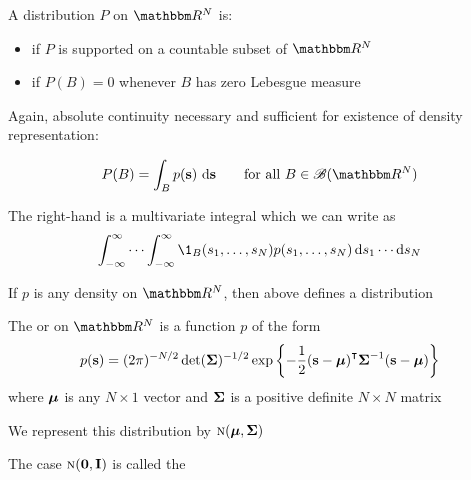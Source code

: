 \begin{frame}

    \vspace{2em}
     A distribution $P$ on $\RR^N$ is:
     \begin{itemize}
         \item {} if $P$ is supported on a countable subset of $\RR^N$
         \item {} if $P(B) = 0$ whenever $B$ has zero Lebesgue measure
     \end{itemize}

\end{frame}

\begin{frame}
    
    \vspace{2em}
    Again, absolute continuity necessary and sufficient for existence of
    density representation:
    
    \begin{equation*}
    \label{eq:drbd3}
    P(B) = \int_B p(\bolds) \, \diff  \bolds
    \qquad \text{for all } B \in \bB(\RR^N)
    \end{equation*}
    
    \vspace{2em}
    The right-hand
    is a multivariate integral which we can write as
    \begin{equation*}
        \label{eq:defjd0}
        \int_{-\infty}^{\infty}
            \cdots
            \int_{-\infty}^{\infty} 
            \1_B (s_1,\ldots,s_N)
            p(s_1,\ldots,s_N) 
            \diff s_1 \cdots \diff s_N
    \end{equation*}
    
    If $p$ is any density on $\RR^N$, then above defines a
    distribution
    
\end{frame}

\begin{frame}

    \vspace{2em}
    \Eg\label{eg:mnden}
    The  or  on $\RR^N$
    is a function $p$ of the form
    \begin{equation*}
        \label{eq:mnormden}
        p(\bolds) = (2 \pi)^{-N/2} \det(\boldSigma)^{-1/2} 
        \exp \left\{ 
            - \frac{1}{2} (\bolds - \boldmu)^\T \boldSigma^{-1} (\bolds - \boldmu) 
        \right\}
    \end{equation*}
    where ${\boldsymbol \mu}$ is any $N \times 1$ vector and ${\boldsymbol \Sigma}$ is a positive
    definite $N \times N$ matrix
    
    We represent this distribution
    by $\textrm{\sc n}({\boldsymbol \mu}, {\boldsymbol \Sigma})$
    
    \vspace{1em}
    The case $\textrm{\sc n}({\mathbf 0}, \mathbf I)$ is
    called the 
    
\end{frame}

